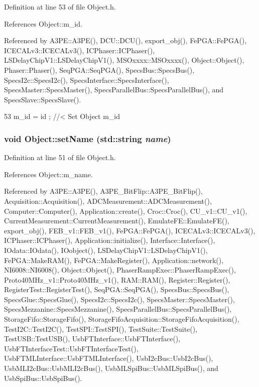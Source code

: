Definition at line 53 of file Object.h.

References Object::m\_\-id.

Referenced by A3PE::A3PE(), DCU::DCU(), export\_\-obj(), FePGA::FePGA(), ICECALv3::ICECALv3(), ICPhaser::ICPhaser(), LSDelayChipV1::LSDelayChipV1(), MSOxxxx::MSOxxxx(), Object::Object(), Phaser::Phaser(), SeqPGA::SeqPGA(), SpecsBus::SpecsBus(), SpecsI2c::SpecsI2c(), SpecsInterface::SpecsInterface(), SpecsMaster::SpecsMaster(), SpecsParallelBus::SpecsParallelBus(), and SpecsSlave::SpecsSlave().


\begin{DoxyCode}
53 { m_id    = id    ; } //< Set Object m_id
\end{DoxyCode}
\hypertarget{classObject_ae30fea75683c2d149b6b6d17c09ecd0c}{
\subsubsection[{setName}]{\setlength{\rightskip}{0pt plus 5cm}void Object::setName (std::string {\em name})}}
\label{classObject_ae30fea75683c2d149b6b6d17c09ecd0c}


Definition at line 51 of file Object.h.

References Object::m\_\-name.

Referenced by A3PE::A3PE(), A3PE\_\-BitFlip::A3PE\_\-BitFlip(), Acquisition::Acquisition(), ADCMeasurement::ADCMeasurement(), Computer::Computer(), Application::create(), Croc::Croc(), CU\_\-v1::CU\_\-v1(), CurrentMeasurement::CurrentMeasurement(), EmulateFE::EmulateFE(), export\_\-obj(), FEB\_\-v1::FEB\_\-v1(), FePGA::FePGA(), ICECALv3::ICECALv3(), ICPhaser::ICPhaser(), Application::initialize(), Interface::Interface(), IOdata::IOdata(), IOobject(), LSDelayChipV1::LSDelayChipV1(), FePGA::MakeRAM(), FePGA::MakeRegister(), Application::network(), NI6008::NI6008(), Object::Object(), PhaserRampExec::PhaserRampExec(), Proto40MHz\_\-v1::Proto40MHz\_\-v1(), RAM::RAM(), Register::Register(), RegisterTest::RegisterTest(), SeqPGA::SeqPGA(), SpecsBus::SpecsBus(), SpecsGlue::SpecsGlue(), SpecsI2c::SpecsI2c(), SpecsMaster::SpecsMaster(), SpecsMezzanine::SpecsMezzanine(), SpecsParallelBus::SpecsParallelBus(), StorageFifo::StorageFifo(), StorageFifoAcquisition::StorageFifoAcquisition(), TestI2C::TestI2C(), TestSPI::TestSPI(), TestSuite::TestSuite(), TestUSB::TestUSB(), UsbFTInterface::UsbFTInterface(), UsbFTInterfaceTest::UsbFTInterfaceTest(), UsbFTMLInterface::UsbFTMLInterface(), UsbI2cBus::UsbI2cBus(), UsbMLI2cBus::UsbMLI2cBus(), UsbMLSpiBus::UsbMLSpiBus(), and UsbSpiBus::UsbSpiBus().


